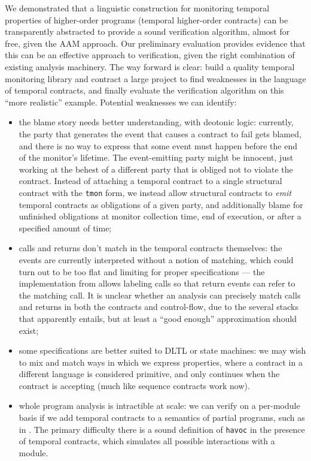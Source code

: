 We demonstrated that a linguistic construction for monitoring temporal properties of higher-order programs (temporal higher-order contracts) can be transparently abstracted to provide a sound verification algorithm, almost for free, given the AAM approach.
%
Our preliminary evaluation provides evidence that this can be an effective approach to verification, given the right combination of existing analysis machinery.
%
The way forward is clear: build a quality temporal monitoring library and contract a large project to find weaknesses in the language of temporal contracts, and finally evaluate the verification algorithm on this ``more realistic'' example.
%
Potential weaknesses we can identify:
\begin{itemize}
\item{the blame story needs better understanding, with deotonic logic:
%
currently, the party that generates the event that causes a contract to fail gets blamed, and there is no way to express that some event must happen before the end of the monitor's lifetime.
%
The event-emitting party might be innocent, just working at the behest of a different party that is obliged not to violate the contract.
%
Instead of attaching a temporal contract to a single structural contract with the {\tt tmon} form, we instead allow structural contracts to \emph{emit} temporal contracts as obligations of a given party, and additionally blame for unfinished obligations at monitor collection time, end of execution, or after a specified amount of time;
}
%
\item{calls and returns don't match in the temporal contracts themselves:
%
the events are currently interpreted without a notion of matching, which could turn out to be too flat and limiting for proper specifications --- the implementation from \dfm{} allows labeling calls so that return events can refer to the matching call.
%
It is unclear whether an analysis can precisely match calls and returns in both the contracts and control-flow, due to the several stacks that apparently entails, but at least a ``good enough'' approximation should exist;
}
%
\item{some specifications are better suited to DLTL or state machines:
%
we may wish to mix and match ways in which we express properties, where a contract in a different language is considered primitive, and only continues when the contract is accepting (much like sequence contracts work now).
}
%
\item{whole program analysis is intractible at scale:
%
we can verify on a per-module basis if we add temporal contracts to a semantics of partial programs, such as in \citet{dvanhorn:TobinHochstadt2012Higherorder}.
%
The primary difficulty there is a sound definition of {\tt havoc} in the presence of temporal contracts, which simulates all possible interactions with a module.
}
\end{itemize}
%
%
